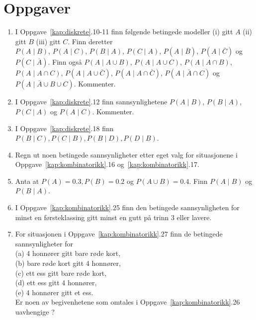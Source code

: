 \section{Oppgaver}
\small
\begin{enumerate}
	\item   I Oppgave~\ref*{kap:diskrete}.10-11 finn følgende betingede modeller (i)
     gitt $A$ (ii) gitt $B$ (iii) gitt $C$. Finn deretter  \\
     $P(A\mid B)$, $P(A\mid C)$, $P(B\mid A)$, $P(C\mid A)$,     
     $P(A\mid \bar{B})$, $P(A\mid \bar{C})$ og $P(C\mid \bar{A})$.
     Finn også  $P(A\mid A \cup B)$,  $P(A\mid A \cup C)$,
     $P(A\mid A \cap B)$,  $P(A\mid A \cap C)$,
     $P(A\mid A \cup \bar{C})$, $P(A\mid A \cap \bar{C})$,
     $P(A \mid \bar{A} \cap C)$ og $P(A \mid \bar{A} \cup B \cup C)$. 
     Kommenter.

\item   I Oppgave~\ref*{kap:diskrete}.12 finn sannsynlighetene $P(A\mid B)$, $P(B\mid
     A)$, $P(C\mid A)$ og $P(A\mid C)$. Kommenter.

\item   I Oppgave~\ref*{kap:diskrete}.18 finn $P(B\mid C), P(C\mid B), P(B\mid D),
     P(D\mid B)$.

\item   Regn ut noen betingede sannsynligheter etter eget valg for
	situasjonene i Oppgave~\ref*{kap:kombinatorikk}.16 og~\ref*{kap:kombinatorikk}.17.

\item  Anta at $P(A) = 0.3, P(B) = 0.2$ og $P(A \cup B) = 0.4$.
     Finn $P(A\mid B)$ og $P(B\mid A)$.

\item  I Oppgave~\ref*{kap:kombinatorikk}.25 finn den betingede sannsynligheten for minst
     en førsteklassing gitt minst en gutt på trinn 3 eller
     lavere.

\item   For situasjonen i Oppgave~\ref*{kap:kombinatorikk}.27 finn de betingede
     sannsynligheter for\\
     (a)  4 honnører gitt bare røde kort,\\
     (b)  bare røde kort gitt 4 honnører,\\
     (c)  ett ess gitt bare røde kort,\\
     (d)  ett ess gitt 4 honnører,\\
     (e)  4 honnører gitt et ess.\\
     Er noen av begivenhetene som omtales i Oppgave~\ref*{kap:kombinatorikk}.26
     uavhengige ?


\end{enumerate}
